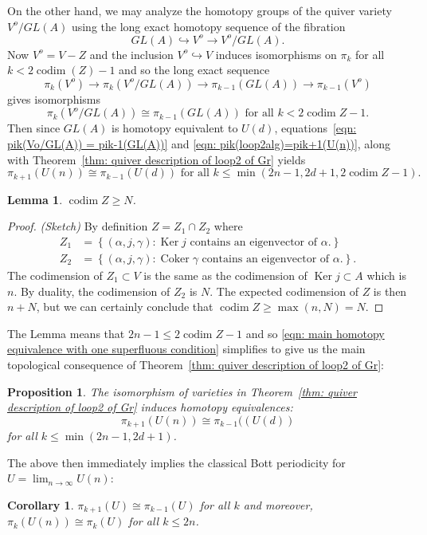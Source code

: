 \documentclass{amsart}
\newtheorem{proposition}[theorem]{Proposition}
\newtheorem{lemma}[theorem]{Lemma}
\newtheorem{corollary}[theorem]{Corollary}
\theoremstyle{definition}
\newcommand{\Ker}{\operatorname{Ker}}
\newcommand{\Coker}{\operatorname{Coker}}
\newcommand{\codim}{\operatorname{codim}}
\begin{document}
On the other hand, we may analyze the homotopy groups of the quiver
variety $V^{o}/GL(A)$ using the long exact homotopy sequence of the
fibration
\[
GL(A)\hookrightarrow V^{o} \to V^{o}/GL(A). 
\]
Now $V^{o} = V-Z$ and the inclusion $V^{o} \hookrightarrow V$ induces
isomorphisms on $\pi_{k}$ for all $k< 2\codim(Z)-1$
\cite[Prop~7.1]{Anderson-Fulton} and so the long exact sequence
\[
\pi_{k}(V^{o})\to \pi_{k}(V^{o}/GL(A)) \to \pi_{k-1}(GL(A)) \to \pi_{k-1}(V^{o})
\]
gives isomorphisms
\begin{equation}\label{eqn: pik(Vo/GL(A)) = pik-1(GL(A))}
\pi_{k}(V^{o}/GL(A))\cong \pi_{k-1}(GL(A)) \text{  for all $k<2\codim Z
-1$}.
\end{equation}
Then since $GL(A)$ is homotopy equivalent to $U(d)$,
equations~\eqref{eqn: pik(Vo/GL(A)) = pik-1(GL(A))} and \eqref{eqn:
pik(loop2alg)=pik+1(U(n))}, along with Theorem~\ref{thm: quiver
description of loop2 of Gr} yields
\begin{equation}\label{eqn: main homotopy equivalence with one
superfluous condition}
\pi_{k+1}(U(n))\cong \pi_{k-1}(U(d))\text{   for all   } k\leq \min
(2n-1,2d+1, 2\codim Z - 1).
\end{equation}

\begin{lemma}
$\codim Z \geq N$. 
\end{lemma}
\begin{proof}
\emph{(Sketch)} By definition $Z=Z_{1}\cap Z_{2} $ where
\begin{align*}
Z_{1}&= \left\{(\alpha ,j,\gamma ): \text{$\Ker j$ contains an
eigenvector of $\alpha$}.  \right\}\\
Z_{2}&= \left\{(\alpha ,j,\gamma ): \text{$\Coker \gamma  $ contains an
eigenvector of $\alpha$}.  \right\}.
\end{align*}
The codimension of $Z_{1}\subset V$ is the same as the codimension of
$\Ker j \subset A$ which is $n$. By duality, the codimension of
$Z_{2}$ is $N$. The expected codimension of $Z$ is then $n+N$, but we
can certainly conclude that $\codim Z\geq \max (n,N)=N$.
\end{proof}
The Lemma means that $2n-1\leq 2\codim Z-1$ and so \eqref{eqn: main
homotopy equivalence with one superfluous condition} simplifies to
give us the main topological consequence of Theorem~\ref{thm: quiver
description of loop2 of Gr}: 
\begin{proposition}\label{prop: main homotopy equivalence}
The isomorphism of varieties in Theorem~\ref{thm: quiver description
of loop2 of Gr} induces homotopy equivalences:
\[
\pi_{k+1}(U(n))\cong \pi_{k-1}((U(d))
\]
for all $k\leq \min (2n-1,2d+1)$.
\end{proposition}
The above then immediately implies the classical Bott periodicity for
$U=\lim_{n\to \infty}U(n)$:
\begin{corollary}
$\pi_{k+1}(U)\cong \pi_{k-1}(U)$ for all $k$ and moreover,
$\pi_{k}(U(n))\cong \pi_{k}(U) $ for all $k\leq 2n$.
\end{corollary}








\end{document}
